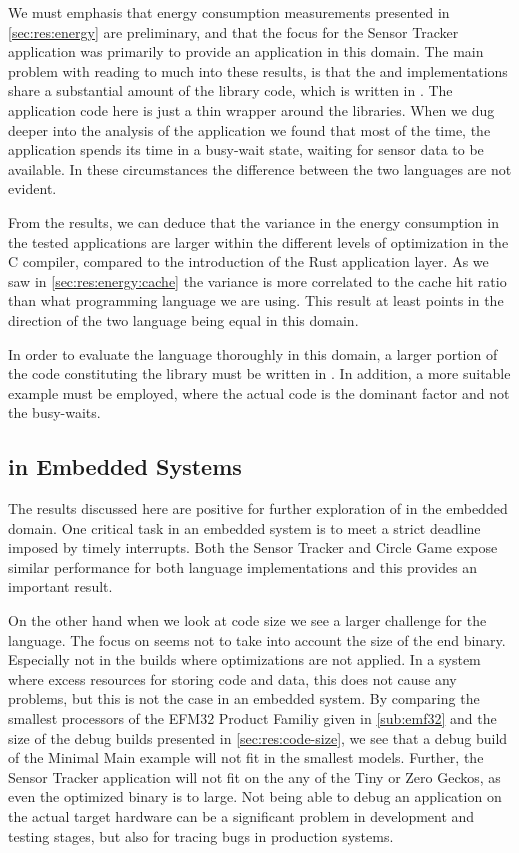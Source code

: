 We must emphasis that energy consumption measurements presented in \autoref{sec:res:energy} are preliminary, and that the focus for the Sensor Tracker application was primarily to provide an application in this domain.
The main problem with reading to much into these results, is that the {\rust} and {\C} implementations share a substantial amount of the library code, which is written in {\C}.
The application code here is just a thin wrapper around the libraries.
When we dug deeper into the analysis of the application we found that most of the time, the application spends its time in a busy-wait state, waiting for sensor data to be available.
In these circumstances the difference between the two languages are not evident.

From the results, we can deduce that the variance in the energy consumption in the tested applications are larger within the different levels of optimization in the C compiler, compared to the introduction of the Rust application layer.
As we saw in \autoref{sec:res:energy:cache} the variance is more correlated to the cache hit ratio than what programming language we are using.
This result at least points in the direction of the two language being equal in this domain.

In order to evaluate the {\rust} language thoroughly in this domain, a larger portion of the code constituting the library must be written in {\rust}.
In addition, a more suitable example must be employed, where the actual code is the dominant factor and not the busy-waits.

\subsection{{\rust} in Embedded Systems}

The results discussed here are positive for further exploration of {\rust} in the embedded domain.
One critical task in an embedded system is to meet a strict deadline imposed by timely interrupts.
Both the Sensor Tracker and Circle Game expose similar performance for both language implementations and this provides an important result.

On the other hand when we look at code size we see a larger challenge for the {\rust} language.
The focus on  seems not to take into account the size of the end binary.
Especially not in the builds where optimizations are not applied.
In a system where excess resources for storing code and data, this does not cause any problems, but this is not the case in an embedded system.
By comparing the smallest processors of the EFM32 Product Familiy given in \autoref{sub:emf32} and the size of the debug builds presented in \autoref{sec:res:code-size}, we see that a debug build of the Minimal Main example will not fit in the smallest models.
Further, the Sensor Tracker application will not fit on the any of the Tiny or Zero Geckos, as even the optimized binary is to large.
Not being able to debug an application on the actual target hardware can be a significant problem in development and testing stages, but also for tracing bugs in production systems.
